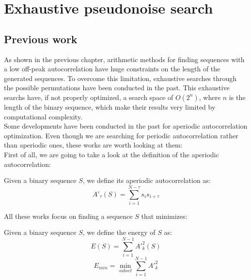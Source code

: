 \chapter{Exhaustive pseudonoise search}
  \section{Previous work}

  As shown in the previous chapter, arithmetic methods for finding sequences
  with a low off-peak autocorrelation have huge constraints on the length of
  the generated sequences. To overcome this limitation, exhaustive searches
  through the possible permutations have been conducted in the past. This
  exhaustive searchs have, if not properly optimized, a search space of
  $O(2^n)$, where $n$ is the length of the binary sequence, which make their
  results very limited by computational complexity.\\

  Some developments have been conducted in the past for aperiodic
  autocorrelation optimization. Even though we are searching for periodic
  autocorrelation rather than aperiodic ones, these works are worth looking
  at them:\\

  First of all, we are going to take a look at the definition of the
  aperiodic autocorrelation:\\
  \begin{definition}
      Given a binary sequence $S$, we define its aperiodic autocorrelation as:
      \begin{equation}
        A'_{\tau}(S) = \sum_{i=1}^{N-\tau}s_{i}s_{i+\tau}
      \end{equation}
  \end{definition}

  All these works focus on finding a sequence $S$ that minimizes:

  \begin{definition} Given a binary sequence $S$, we define the energy of $S$
    as:
    \begin{equation}
      E(S) = \sum_{i=1}^{N-1} A'^{2}_{k}(S)
    \end{equation}
    \begin{equation}
      E_{min} = \operatorname*{min}_{subset} \sum_{i=1}^{N-1} A'^{2}_{k}
    \end{equation}
  \end{definition}

